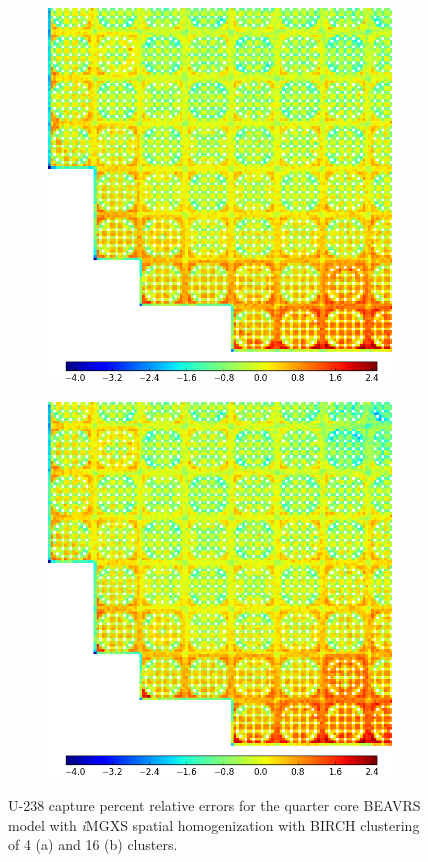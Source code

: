 \clearpage

\begin{figure}[h!]
\centering
\begin{subfigure}{0.9\textwidth}
  \centering
  \includegraphics[width=0.65\linewidth]{figures/results/spatial/full-core/capt-err-birch-4}
  \caption{}
  \label{fig:chap11-full-core-capt-err-birch-4}
\end{subfigure}
\begin{subfigure}{0.9\textwidth}
  \centering
\includegraphics[width=0.65\linewidth]{figures/results/spatial/full-core/capt-err-birch-16}
  \caption{}
  \label{fig:chap11-full-core-capt-err-birch-16}
\end{subfigure}
\caption[U-238 capture rate errors for \ac{BEAVRS}]{U-238 capture percent relative errors for the quarter core \ac{BEAVRS} model with \textit{i}\ac{MGXS} spatial homogenization with BIRCH clustering of 4 (a) and 16 (b) clusters.}
\label{fig:chap11-full-core-capt-err-b}
\end{figure}

